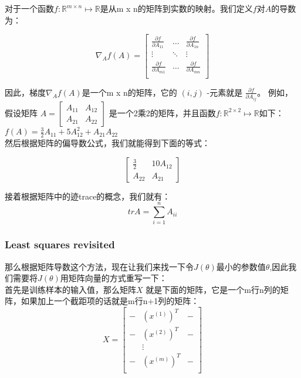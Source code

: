 \documentclass[UTF8]{ctexart}
\begin{document}
对于一个函数$f:\mathbb{R}^{m \times n} \mapsto \mathbb{R}$是从m x n的矩阵到实数的映射。我们定义$f$对$A$的导数为：
\begin{center}
\[ \nabla_{A}f(A)= \begin{bmatrix}
\frac{\partial f }{\partial A_{11}}  & \ldots & \frac{\partial f }{\partial A_{1n}}\\
\vdots & \ddots & \vdots\\
\frac{\partial f }{\partial A_{m1}}  & \ldots & \frac{\partial f }{\partial A_{mn}}\\
\end{bmatrix}
\]
\end{center}


因此，梯度$\nabla_{A}f(A)$是一个m x n的矩阵，它的 $(i,j)$ -元素就是 $\frac{\partial f }{\partial A_{ij}}$。
例如，假设矩阵 $A = \begin{bmatrix} A_{11} & A_{12} \\ A_{21} & A_{22}\end{bmatrix}$ 是一个2乘2的矩阵，并且函数$f:\mathbb{R}^{2\times 2} \mapsto \mathbb{R}$如下：\\

$f(A)=\frac{3}{2}A_{11} + 5A_{12}^{2}+A_{21}A_{22}$\\


然后根据矩阵的偏导数公式，我们就能得到下面的等式：

\[ \begin{bmatrix} \frac{3}{2} & 10A_{12} \\ A_{22} & A_{21} \end{bmatrix} \]

接着根据矩阵中的迹trace的概念，我们就有：
\[trA = \sum_{i=1}^{n}{A_{ii}} \]

\subsubsection{Least squares revisited}
那么根据矩阵导数这个方法，现在让我们来找一下令$J(\theta)$最小的参数值$\theta$,因此我们需要将$J(\theta)$用矩阵向量的方式重写一下：\\

首先是训练样本的输入值，那么矩阵$X$ 就是下面的矩阵，它是一个m行n列的矩阵，如果加上一个截距项的话就是m行n+1列的矩阵：
\[ X=\begin{bmatrix}  - & (x^{(1)})^{T} & - \\ - & (x^{(2)})^{T} & - \\ & \vdots & \\- & (x^{(m)})^{T}   & - \\ \end{bmatrix}   \]
\end{document}

